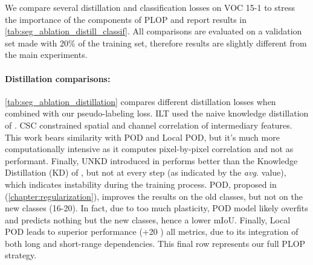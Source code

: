 We compare several distillation and classification losses on VOC 15-1 to stress the importance of
the components of PLOP and report results in \autoref{tab:seg_ablation_distill_classif}. All
comparisons are evaluated on a validation set made with 20\% of the training set, therefore results are
slightly different from the main experiments.

\paragraph{Distillation comparisons:} \autoref{tab:seg_ablation_distillation} compares different
distillation losses when combined with our pseudo-labeling loss. ILT \citep{michieli2019ilt} used
the naive knowledge distillation of \cite{hinton2015knowledge_distillation}. CSC \citep{park2020csc}
constrained spatial and channel correlation of intermediary features. This work bears similarity
with POD and Local POD, but it's much more computationally intensive as it computes pixel-by-pixel
correlation and not as performant. Finally, UNKD introduced in
\cite{cermelli2020modelingthebackground} performs better than the Knowledge Distillation (KD) of
\cite{hinton2015knowledge_distillation}, but not at every step (as indicated by the \textit{avg.}
value), which indicates instability during the training process. POD, proposed in
\cite{douillard2020podnet} (\autoref{chapter:regularization}), improves the results on the old
classes, but not on the new classes (16-20). In fact, due to too much plasticity, POD model likely
overfits and predicts nothing but the new classes, hence a lower \ac{mIoU}.  Finally, Local POD
leads to superior performance (+20 \pp) \wrt all metrics, due to its integration of both long and
short-range dependencies. This final row represents our full PLOP strategy.


